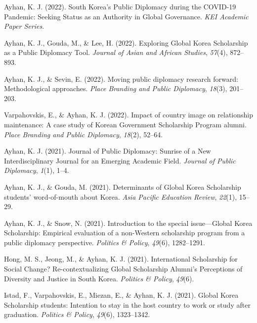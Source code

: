 \documentclass[11pt,a4paper,]{awesome-cv}
\begin{document}
\leavevmode{}%
Ayhan, K. J. (2022). South {Korea}'s {Public} {Diplomacy} during the
{COVID}-19 {Pandemic}: {Seeking} {Status} as an {Authority} in {Global}
{Governance}. \emph{KEI Academic Paper Series}.

\leavevmode{}%
Ayhan, K. J., Gouda, M., \& Lee, H. (2022). Exploring {Global} {Korea}
{Scholarship} as a {Public} {Diplomacy} {Tool}. \emph{Journal of Asian
and African Studies}, \emph{57}(4), 872--893.

\leavevmode{}%
Ayhan, K. J., \& Sevin, E. (2022). Moving public diplomacy research
forward: Methodological approaches. \emph{Place Branding and Public
Diplomacy}, \emph{18}(3), 201--203.

\leavevmode{}%
Varpahovskis, E., \& Ayhan, K. J. (2022). Impact of country image on
relationship maintenance: A case study of {Korean} {Government}
{Scholarship} {Program} alumni. \emph{Place Branding and Public
Diplomacy}, \emph{18}(2), 52--64.

\leavevmode{}%
Ayhan, K. J. (2021). Journal of {Public} {Diplomacy}: {Sunrise} of a
{New} {Interdisciplinary} {Journal} for an {Emerging} {Academic}
{Field}. \emph{Journal of Public Diplomacy}, \emph{1}(1), 1--4.

\leavevmode{}%
Ayhan, K. J., \& Gouda, M. (2021). Determinants of {Global} {Korea}
{Scholarship} students' word-of-mouth about {Korea}. \emph{Asia Pacific
Education Review}, \emph{22}(1), 15--29.

\leavevmode{}%
Ayhan, K. J., \& Snow, N. (2021). Introduction to the special
issue---{Global} {Korea} {Scholarship}: {Empirical} evaluation of a
non-{Western} scholarship program from a public diplomacy perspective.
\emph{Politics \& Policy}, \emph{49}(6), 1282--1291.

\leavevmode{}%
Hong, M. S., Jeong, M., \& Ayhan, K. J. (2021). International
{Scholarship} for {Social} {Change}? {Re}-contextualizing {Global}
{Scholarship} {Alumni}'s {Perceptions} of {Diversity} and {Justice} in
{South} {Korea}. \emph{Politics \& Policy}, \emph{49}(6).

\leavevmode{}%
Istad, F., Varpahovskis, E., Miezan, E., \& Ayhan, K. J. (2021). Global
{Korea} {Scholarship} students: {Intention} to stay in the host country
to work or study after graduation. \emph{Politics \& Policy},
\emph{49}(6), 1323--1342.
\end{document}
